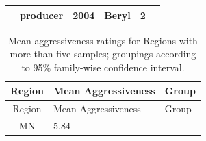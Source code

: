 \documentclass[fleqn,10pt,lineno]{wlpeerj} %
\theoremstyle{definition}
\theoremstyle{definition}
\theoremstyle{definition}
\theoremstyle{remark}
\begin{document}
\begin{longtable}[]{@{}lllrlr@{}}
\begin{minipage}[t]{0.08\columnwidth}
\strut
\end{minipage} & \begin{minipage}[t]{0.12\columnwidth}\raggedright\strut
producer\strut
\end{minipage} & \begin{minipage}[t]{0.19\columnwidth}\raggedleft\strut
2004\strut
\end{minipage} & \begin{minipage}[t]{0.29\columnwidth}\raggedright\strut
Beryl\strut
\end{minipage} & \begin{minipage}[t]{0.04\columnwidth}\raggedleft\strut
2\strut
\end{minipage}\tabularnewline
\bottomrule
\end{longtable}

\begin{longtable}[]{@{}cll@{}}
\caption{\label{tab:region-aggressiveness} Mean aggressiveness ratings for
Regions with more than five samples; groupings according to 95\%
family-wise confidence interval.}\tabularnewline
\toprule
\begin{minipage}[b]{0.14\columnwidth}\centering\strut
Region\strut
\end{minipage} & \begin{minipage}[b]{0.25\columnwidth}\raggedright\strut
Mean Aggressiveness\strut
\end{minipage} & \begin{minipage}[b]{0.08\columnwidth}\raggedright\strut
Group\strut
\end{minipage}\tabularnewline
\midrule
\endfirsthead
\toprule
\begin{minipage}[b]{0.14\columnwidth}\centering\strut
Region\strut
\end{minipage} & \begin{minipage}[b]{0.25\columnwidth}\raggedright\strut
Mean Aggressiveness\strut
\end{minipage} & \begin{minipage}[b]{0.08\columnwidth}\raggedright\strut
Group\strut
\end{minipage}\tabularnewline
\midrule
\endhead
\begin{minipage}[t]{0.14\columnwidth}\centering\strut
MN\strut
\end{minipage} & \begin{minipage}[t]{0.25\columnwidth}\raggedright\strut
5.84\strut
\end{minipage} & \begin{minipage}[t]{0.08\columnwidth}\raggedright\strut

\end{minipage}
\end{longtable}
\end{document}
